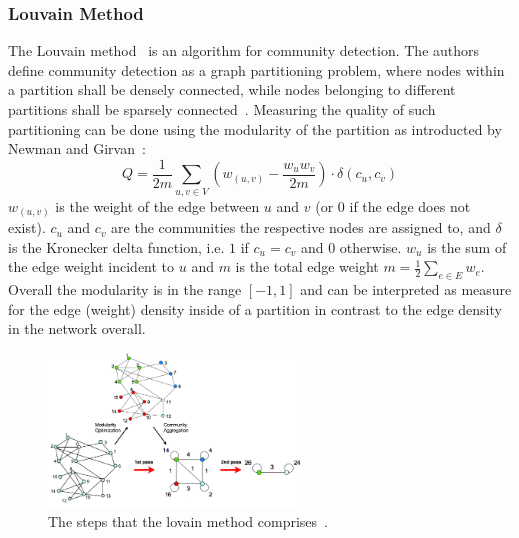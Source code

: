             \subsubsection*{Louvain Method}\label{louvain-desc}
                The Louvain method~\autocite{blondel2008fast} is an algorithm for community detection. 
                The authors define community detection as a graph partitioning problem, where nodes within a partition shall be densely connected, while nodes belonging to different partitions shall be sparsely connected~\autocite{blondel2008fast}.
                Measuring the quality of such partitioning can be done using the modularity of the partition as introducted by Newman and Girvan~\autocite{girvan2002community}:
                \[ Q = \frac{1}{2m} \sum_{u,v \in V} \left( w_{(u, v)} - \frac{w_u w_v}{2m} \right) \cdot \delta (c_u, c_v) \]
                $w_{(u,v)}$ is the weight of the edge between $u$ and $v$ (or $0$ if the edge does not exist). 
                $c_u$ and $c_v$ are the communities the respective nodes are assigned to, and $\delta$ is the Kronecker delta function, i.e. $1$ if $c_u = c_v$ and $0$ otherwise. 
                $w_u$ is the sum of the edge weight incident to $u$ and $m$ is the total edge weight $m = \frac{1}{2} \sum_{e \in E} w_e$.
                Overall the modularity is in the range $[-1, 1]$ and can be interpreted as measure for the edge (weight) density inside of a partition in contrast to the edge density in the network overall.
                
                \begin{figure}[htp]
                    \begin{center}
                        \includegraphics[keepaspectratio,width=0.6\textwidth]{img/03-graphs/louvain.png}
                    \end{center}
                    \caption{The steps that the lovain method comprises~\autocite{blondel2008fast}.} 
                    \label{louvain-fig}
                \end{figure}
                
